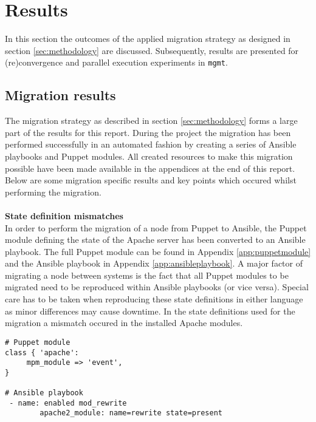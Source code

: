 \section{Results}\label{sec:results}
In this section the outcomes of the applied migration strategy as designed in section \ref{sec:methodology} are discussed. Subsequently, results are presented for (re)convergence and parallel execution experiments in \texttt{mgmt}.

\subsection{Migration results}
The migration strategy as described in section \ref{sec:methodology} forms a large part of the results for this report. During the project the migration has been performed successfully in an automated fashion by creating a series of Ansible playbooks and Puppet modules. All created resources to make this migration possible have been made available in the appendices at the end of this report. Below are some migration specific results and key points which occured whilst performing the migration. 
\\\\
\noindent
\textbf{State definition mismatches}\\
In order to perform the migration of a node from Puppet to Ansible, the Puppet module defining the state of the Apache server has been converted to an Ansible playbook. The full Puppet module can be found in Appendix \ref{app:puppetmodule} and the Ansible playbook in Appendix \ref{app:ansibleplaybook}. A major factor of migrating a node between systems is the fact that all Puppet modules to be migrated need to be reproduced within Ansible playbooks (or vice versa). Special care has to be taken when reproducing these state definitions in either language as minor differences may cause downtime. In the state definitions used for the migration a mismatch occured in the installed Apache modules.
\\
\begin{lstlisting}[caption={Module mismatch in state definitions},label=puppetmod]
# Puppet module
class { 'apache':
     mpm_module => 'event',
}

# Ansible playbook
 - name: enabled mod_rewrite
        apache2_module: name=rewrite state=present
\end{lstlisting}

